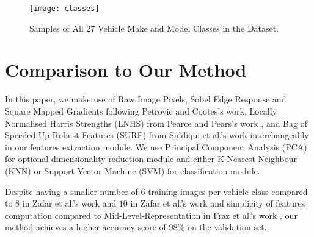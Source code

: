 \begin{figure}
\centering
\texttt{[image: classes]}
\caption{Samples of All $27$ Vehicle Make and Model Classes in the Dataset.}
\label{fig:classes}
\end{figure}

\section{Comparison to Our Method}

In this paper, we make use of 
Raw Image Pixels, Sobel Edge Response and Square Mapped Gradients following Petrovic and Cootes's \citep{petrovic2004analysis} work, 
Locally Normalised Harris Strengths (LNHS) from Pearce and Pears's work \citep{pearce2011automatic}, and 
Bag of Speeded Up Robust Features (SURF) from Siddiqui et al.'s work \citep{siddiqui2016real} 
interchangeably in our features extraction module.
We use Principal Component Analysis (PCA) for optional dimensionality reduction module and either 
K-Nearest Neighbour (KNN) or
Support Vector Machine (SVM) for classification module.

Despite having a smaller number of $6$ training images per vehicle class compared to $8$ in Zafar et al.'s work \citep{zafar2007two} and $10$ in Zafar et al.'s work \citep{zafar2009localized} and simplicity of features computation compared to Mid-Level-Representation in Fraz et al.'s work \citep{fraz2014mid}, our method achieves a higher accuracy score of $98\%$ on the validation set.






